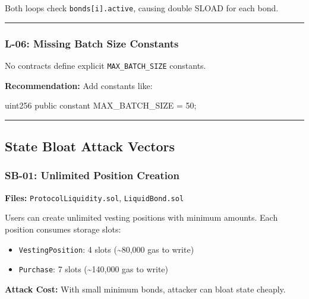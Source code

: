 \documentclass[
]{article}
\newenvironment{Shaded}{}{}
\newcommand{\NormalTok}[1]{#1}
\providecommand{\tightlist}{%
  \setlength{\itemsep}{0pt}\setlength{\parskip}{0pt}}
\begin{document}
Both loops check \texttt{bonds{[}i{]}.active}, causing double SLOAD for
each bond.

\begin{center}\rule{0.5\linewidth}{0.5pt}\end{center}

\subsubsection{L-06: Missing Batch Size
Constants}\label{l-06-missing-batch-size-constants}

No contracts define explicit \texttt{MAX\_BATCH\_SIZE} constants.

\textbf{Recommendation:} Add constants like:

\begin{Shaded}
\begin{Highlighting}[]
\NormalTok{uint256 public constant MAX\_BATCH\_SIZE = 50;}
\end{Highlighting}
\end{Shaded}

\begin{center}\rule{0.5\linewidth}{0.5pt}\end{center}

\subsection{State Bloat Attack
Vectors}\label{state-bloat-attack-vectors}

\subsubsection{SB-01: Unlimited Position
Creation}\label{sb-01-unlimited-position-creation}

\textbf{Files:} \texttt{ProtocolLiquidity.sol}, \texttt{LiquidBond.sol}

Users can create unlimited vesting positions with minimum amounts. Each
position consumes storage slots:

\begin{itemize}
\tightlist
\item
  \texttt{VestingPosition}: 4 slots (\textasciitilde80,000 gas to write)
\item
  \texttt{Purchase}: 7 slots (\textasciitilde140,000 gas to write)
\end{itemize}

\textbf{Attack Cost:} With small minimum bonds, attacker can bloat state
cheaply.
\end{document}
